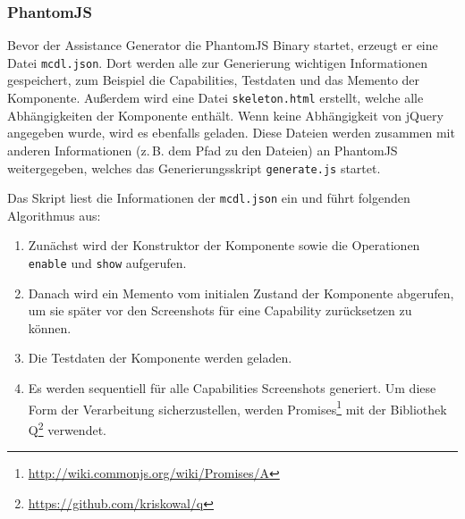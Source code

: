 \documentclass[
	headsepline,
	footsepline,
	fontsize=12pt,
	bibliography=totoc
]{scrbook}
\begin{document}


\subsubsection{PhantomJS}


Bevor der Assistance Generator die PhantomJS Binary startet, erzeugt er eine Datei \texttt{mcdl.json}. Dort werden alle zur Generierung wichtigen Informationen gespeichert, zum Beispiel die Capabilities, Testdaten und das Memento der Komponente. Außerdem wird eine Datei \texttt{skeleton.html} erstellt, welche alle Abhängigkeiten der Komponente enthält. Wenn keine Abhängigkeit von jQuery angegeben wurde, wird es ebenfalls geladen. Diese Dateien werden zusammen mit anderen Informationen (z.\,B. dem Pfad zu den Dateien) an PhantomJS weitergegeben, welches das Generierungsskript \texttt{generate.js} startet.

Das Skript liest die Informationen der \texttt{mcdl.json} ein und führt folgenden Algorithmus aus:

\begin{enumerate}
	\item Zunächst wird der Konstruktor der Komponente sowie die Operationen \texttt{enable} und \texttt{show} aufgerufen.
	\item Danach wird ein Memento vom initialen Zustand der Komponente abgerufen, um sie später vor den Screenshots für eine Capability zurücksetzen zu können.
	\item Die Testdaten der Komponente werden geladen.
	\item Es werden sequentiell für alle Capabilities Screenshots generiert. Um diese Form der Verarbeitung sicherzustellen, werden Promises\footnote{\url{http://wiki.commonjs.org/wiki/Promises/A}} mit der Bibliothek Q\footnote{\url{https://github.com/kriskowal/q}} verwendet.
\end{enumerate}
\end{document}
